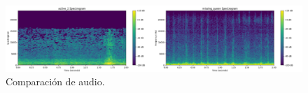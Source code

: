 \begin{figure}[!ht]
    \centering
    \includegraphics[width=\textwidth]{assets/cap_3/comparacion_audio.png}
    \caption{Comparación de audio.}
    \label{fig:comparacion_audio}
\end{figure}
